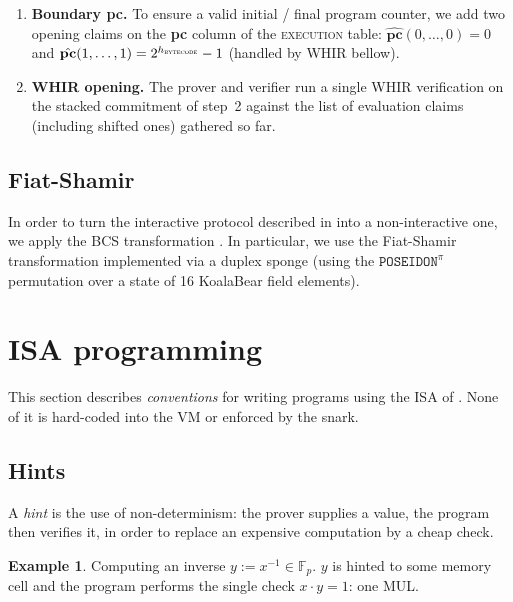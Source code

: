 \documentclass{article}
\theoremstyle{definition}
\newtheorem{exmp}{Example}[section]
\newcommand{\Fp}{\mathbb F_p}
\begin{document}
\begin{enumerate}
    \item \textbf{Boundary pc.} To ensure a valid initial / final program counter, we add two opening claims on the \textbf{pc} column of the \textsc{execution} table: $\hat{\textbf{pc}}(0, \ldots, 0) = 0$ and $\hat{\textbf{pc}}(1, \ldots, 1) = 2^{h_\textsc{bytecode}} - 1$ (handled by WHIR bellow).

    \item \textbf{WHIR opening.} The prover and verifier run a single WHIR verification on the stacked commitment of step~2 against the list of evaluation claims (including shifted ones) gathered so far.

\end{enumerate}

\subsection{Fiat-Shamir}

In order to turn the interactive protocol described in  into a non-interactive one, we apply the BCS transformation \cite{BCS}. In particular, we use the Fiat-Shamir transformation implemented via a duplex sponge \cite{fiat_shamir_duplex_sponge} (using the $\texttt{POSEIDON}^\pi$ permutation over a state of 16 KoalaBear field elements).

\section{ISA programming}

This section describes \emph{conventions} for writing programs using the ISA of . None of it is hard-coded into the VM or enforced by the snark.

\subsection{Hints}\label{sec:hints}

A \emph{hint} is the use of non-determinism: the prover supplies a value, the program then verifies it, in order to replace an expensive computation by a cheap check.

\begin{exmp} Computing an inverse $y := x^{-1} \in \Fp$. $y$ is hinted to some memory cell and the program performs the single check $x \cdot y = 1$: one MUL.
\end{exmp}
\end{document}
